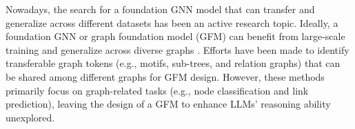 Nowadays, the search for a foundation GNN model that can transfer and generalize across different datasets has been an active research topic. Ideally, a foundation GNN or graph foundation model (GFM) can benefit from large-scale training and generalize across diverse graphs \cite{maoposition,liu2023towards}. Efforts have been made to identify transferable graph tokens (e.g., motifs, sub-trees, and relation graphs) \cite{galkintowards,wang2024gft,xia2024opengraph} that can be shared among different graphs for GFM design. However, these methods primarily focus on graph-related tasks (e.g., node classification and link prediction), leaving the design of a GFM to enhance LLMs' reasoning ability unexplored.


